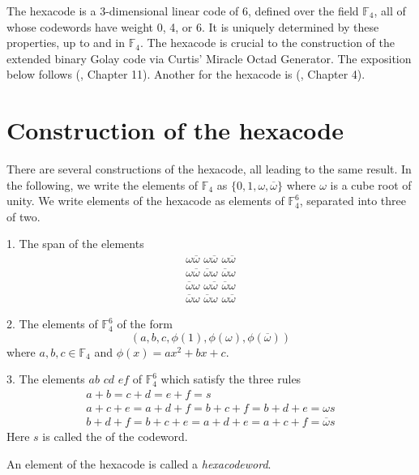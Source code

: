 \documentclass[12pt]{article}
\newcommand{\F}{\mathbb{F}}
\newcommand{\w}{\omega}
\newcommand{\W}{\overline{\omega}}
\newcommand{\cw}[6]{#1#2\,\,#3#4\,\,#5#6}
\begin{document}

The hexacode is a 3-dimensional linear code of  6, defined over the field $\F_4$, all of whose codewords have weight 0, 4, or 6.  It is uniquely determined by these properties, up to  and  in $\F_4$.  The hexacode is crucial to the construction of the extended binary Golay code via Curtis' Miracle Octad Generator.  The exposition below follows (\cite{splag}, Chapter 11).  Another  for the hexacode is (\cite{sporadic}, Chapter 4).

\section{Construction of the hexacode}
There are several constructions of the hexacode, all leading to the same result.  In the following, we write the elements of $\mathbb{F}_4$ as $\{0,1,\w,\W\}$ where $\omega$ is a cube root of unity.  We write elements of the hexacode as elements of $\mathbb{F}_4^6$, separated into three  of two.

1. The span of the elements $$\begin{array}{c}
\cw{\w}{\W}{\w}{\W}{\w}{\W}\\ 
\cw{\w}{\W}{\W}{\w}{\W}{\w}\\
\cw{\W}{\w}{\w}{\W}{\W}{\w}\\
\cw{\W}{\w}{\W}{\w}{\w}{\W}
\end{array}$$

2. The elements of $\F_4^6$ of the form $$(a, b, c, \phi(1), \phi(\w), \phi(\W))$$ where $a, b, c \in \F_4$ and $\phi(x) = ax^2+bx+c$.

3. The elements $\cw{a}{b}{c}{d}{e}{f}$ of $\F_4^6$ which satisfy the three rules
$$\begin{array}{c}
a+b = c+d = e+f = s\\
a+c+e = a+d+f = b+c+f = b+d+e = \w s\\
b+d+f = b+c+e = a+d+e = a+c+f = \W s
\end{array}$$
Here $s$ is called the \emph{} of the codeword.

An element of the hexacode is called a \emph{hexacodeword}.
\end{document}
